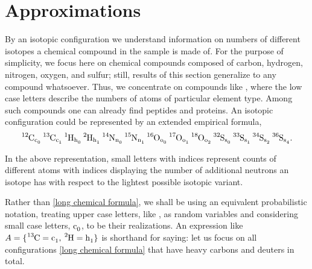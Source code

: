 \section{Approximations}

By an isotopic configuration we understand information on numbers of different isotopes a chemical compound in the sample is made of. For the purpose of simplicity, we focus here on chemical compounds composed of carbon, hydrogen, nitrogen, oxygen, and sulfur; still, results of this section generalize to any compound whatsoever. Thus, we concentrate on compounds like \molecule, where the low case letters describe the numbers of atoms of particular element type. Among such compounds one can already find peptides and proteins. An isotopic configuration could be represented by an extended empirical formula, 
\begin{equation}\label{long chemical formula}
	\text{\moleculeIsotopic}.
\end{equation}

In the above representation, small letters with indices represent counts of different atoms with indices displaying the number of additional neutrons an isotope has with respect to the lightest possible isotopic variant. 

Rather than \eqref{long chemical formula}, we shall be using an equivalent probabilistic notation, treating upper case letters, like , as random variables and considering small case letters, $\cem{c_0}$, to be their realizations. An expression like $A = \{ \ce{^{13}C} = \cem{c_1},\, \ce{^{2}H} = \cem{h_1} \}$ is shorthand for saying: let us focus on all configurations \eqref{long chemical formula} that have  heavy carbons and  deuters in total.


